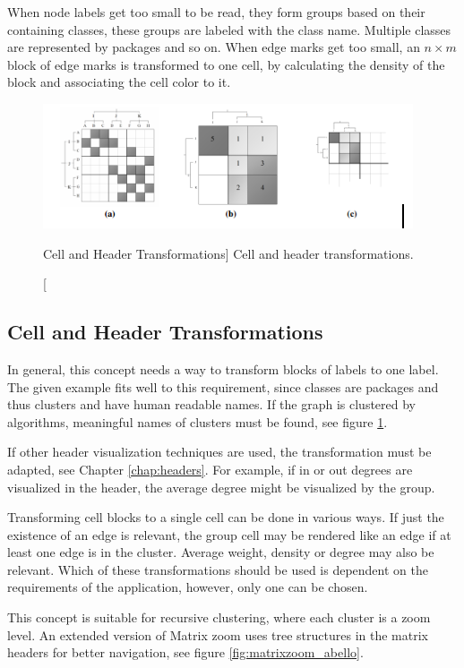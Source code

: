 When node labels get too small to be read, they form groups based on their containing classes, these groups are labeled with the class name. Multiple classes are represented by packages and so on. When edge marks get too small, an $n \times m$ block of edge marks is transformed to one cell, by calculating the density of the block and associating the cell color to it.

\begin{figure}[h]
\centering
\includegraphics{images/matrixzoom_transform}
\caption
  [Cell and Header Transformations]
  {Cell and header transformations.}
  \label{fig:matrixzoom_transform}
\end{figure}




\subsection{Cell and Header Transformations}   
In general, this concept needs a way to transform blocks of labels to one label. The given example fits well to this requirement, since classes are packages and thus clusters and have human readable names. If the graph is clustered by algorithms, meaningful names of clusters must be found, see figure \ref{fig:matrixzoom_transform}.

If other header visualization techniques are used, the transformation must be adapted, see Chapter \ref{chap:headers}. For example, if in or out degrees are visualized in the header, the average degree might be visualized by the group.

Transforming cell blocks to a single cell can be done in various ways. If just the existence of an edge is relevant, the group cell may be rendered like an edge if at least one edge is in the cluster. Average weight, density or degree may also be relevant. Which of these transformations should be used is dependent on the requirements of the application, however, only one can be chosen.

This concept is suitable for recursive clustering, where each cluster is a zoom level. An extended version of Matrix zoom  \citep{abello2004} uses tree structures in the matrix headers for better navigation, see figure \ref{fig:matrixzoom_abello}.

